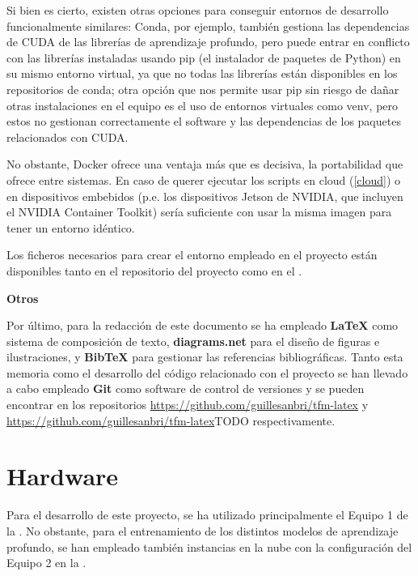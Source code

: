 Si bien es cierto, existen otras opciones para conseguir entornos de desarrollo funcionalmente similares: Conda, por ejemplo, también gestiona las dependencias de CUDA de las librerías de aprendizaje profundo, pero puede entrar en conflicto con las librerías instaladas usando pip (el instalador de paquetes de Python) en su mismo entorno virtual, ya que no todas las librerías están disponibles en los repositorios de conda; otra opción que nos permite usar pip sin riesgo de dañar otras instalaciones en el equipo es el uso de entornos virtuales como venv, pero estos no gestionan correctamente el software y las dependencias de los paquetes relacionados con CUDA. 

No obstante, Docker ofrece una ventaja más que es decisiva, la portabilidad que ofrece entre sistemas. En caso de querer ejecutar los scripts en cloud (\ref{cloud}) o en dispositivos embebidos (p.e. los dispositivos Jetson de NVIDIA, que incluyen el NVIDIA Container Toolkit) sería suficiente con usar la misma imagen para tener un entorno idéntico. 

Los ficheros necesarios para crear el entorno empleado en el proyecto están disponibles tanto en el repositorio del proyecto como en el .


\textbf{Otros}

Por último, para la redacción de este documento se ha empleado \textbf{LaTeX} como sistema de composición de texto, \textbf{diagrams.net} para el diseño de figuras e ilustraciones, y \textbf{BibTeX} para gestionar las referencias bibliográficas. Tanto esta memoria como el desarrollo del código relacionado con el proyecto se han llevado a cabo empleado \textbf{Git} como software de control de versiones y se pueden encontrar en los repositorios \url{https://github.com/guillesanbri/tfm-latex} y \url{https://github.com/guillesanbri/tfm-latex}TODO respectivamente.


\section{Hardware}
Para el desarrollo de este proyecto, se ha utilizado principalmente el Equipo 1 de la . No obstante, para el entrenamiento de los distintos modelos de aprendizaje profundo, se han empleado también instancias en la nube con la configuración del Equipo 2 en la .

